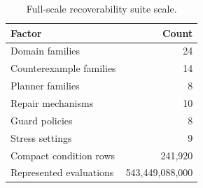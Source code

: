 \begin{table}[t]
\centering
\caption{Full-scale recoverability suite scale.}
\label{tab:scale}
\small
\begin{tabular}{lr}
\toprule
Factor & Count \\
\midrule
Domain families & 24 \\
Counterexample families & 14 \\
Planner families & 8 \\
Repair mechanisms & 10 \\
Guard policies & 8 \\
Stress settings & 9 \\
Compact condition rows & 241,920 \\
Represented evaluations & 543,449,088,000 \\
\bottomrule
\end{tabular}
\end{table}
